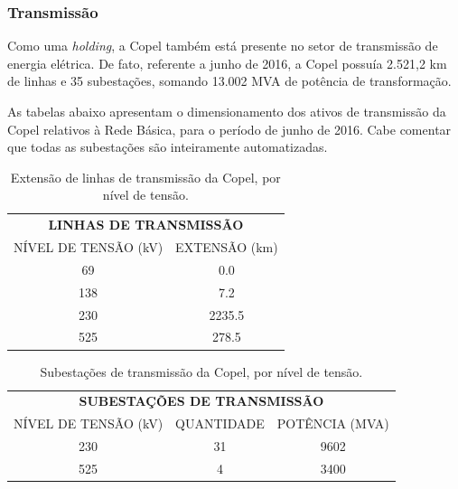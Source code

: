 \documentclass[grad,numbers]{coppe}
\begin{document}
  \hypertarget{transmissuxe3o}{%
  \subsubsection{Transmissão}\label{transmissuxe3o}}

  Como uma \emph{holding}, a Copel também está presente no setor de transmissão de energia elétrica. De fato, referente a junho de 2016, a Copel possuía 2.521,2 km de linhas e 35 subestações, somando 13.002 MVA de potência de transformação.

  As tabelas abaixo apresentam o dimensionamento dos ativos de transmissão da Copel relativos à Rede Básica, para o período de junho de 2016. Cabe comentar que todas as subestações são inteiramente automatizadas.
  \begin{table}[H]

  \caption{\label{tab:unnamed-chunk-3}Extensão de linhas de transmissão da Copel, por nível de tensão.}
  \centering
  \begin{tabular}[t]{cc}
  \toprule
  \multicolumn{2}{c}{\textbf{LINHAS DE TRANSMISSÃO}} \\
  \cmidrule(l{3pt}r{3pt}){1-2}
  NÍVEL DE TENSÃO (kV) & EXTENSÃO (km)\\
  \midrule
  69 & 0.0\\
  138 & 7.2\\
  230 & 2235.5\\
  525 & 278.5\\
  \bottomrule
  \end{tabular}
  \end{table}
  \begin{table}[H]

  \caption{\label{tab:unnamed-chunk-4}Subestações de transmissão da Copel, por nível de tensão.}
  \centering
  \begin{tabular}[t]{ccc}
  \toprule
  \multicolumn{3}{c}{\textbf{SUBESTAÇÕES DE TRANSMISSÃO}} \\
  \cmidrule(l{3pt}r{3pt}){1-3}
  NÍVEL DE TENSÃO (kV) & QUANTIDADE & POTÊNCIA (MVA)\\
  \midrule
  230 & 31 & 9602\\
  525 & 4 & 3400\\
  \bottomrule
  \end{tabular}
  \end{table}
  \(\,\)
\end{document}
